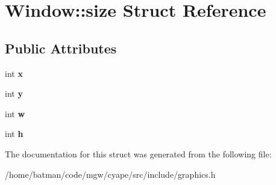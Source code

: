 \hypertarget{structWindow_1_1size}{}\section{Window\+:\+:size Struct Reference}
\label{structWindow_1_1size}
\subsection*{Public Attributes}
\begin{DoxyCompactItemize}
\item 
\hypertarget{structWindow_1_1size_aa1611e8f3e7891df36b8a31f9322368f}{}int {\bfseries x}\label{structWindow_1_1size_aa1611e8f3e7891df36b8a31f9322368f}

\item 
\hypertarget{structWindow_1_1size_a0c214fb71b5ae20819d54e3f5d131fe5}{}int {\bfseries y}\label{structWindow_1_1size_a0c214fb71b5ae20819d54e3f5d131fe5}

\item 
\hypertarget{structWindow_1_1size_a0896ac14af61e41b1dabcc8dec3a7786}{}int {\bfseries w}\label{structWindow_1_1size_a0896ac14af61e41b1dabcc8dec3a7786}

\item 
\hypertarget{structWindow_1_1size_a80518663fb6119e4c335d83538b27916}{}int {\bfseries h}\label{structWindow_1_1size_a80518663fb6119e4c335d83538b27916}

\end{DoxyCompactItemize}


The documentation for this struct was generated from the following file\+:\begin{DoxyCompactItemize}
\item 
/home/batman/code/mgw/cyape/src/include/graphics.\+h\end{DoxyCompactItemize}
